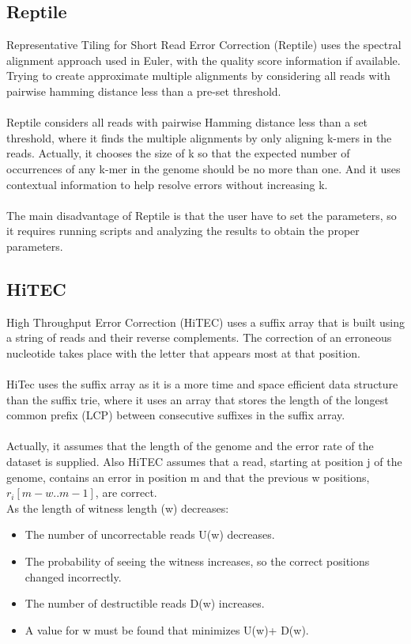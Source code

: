 \documentclass[12pt,openany]{llncs}
\begin{document}
\subsection{Reptile}
Representative Tiling for Short Read Error Correction (Reptile) \cite{Reptile} uses the spectral alignment approach used in Euler, with the quality score information if available. Trying to create approximate multiple alignments by considering all reads with pairwise hamming distance less than a pre-set threshold. 
\\
\\
Reptile considers all reads with pairwise Hamming distance less than a set threshold, where it finds the multiple alignments by only aligning k-mers in the reads. Actually, it chooses the size of k so that the expected number of occurrences of any k-mer in the genome should be no more than one. And it uses contextual information to help resolve errors without increasing k.
\\
\\
The main disadvantage of Reptile is that the user have to set the parameters, so it
requires running scripts and analyzing the results to obtain the proper parameters.

\subsection{HiTEC}
High Throughput Error Correction (HiTEC) \cite{HiTec} uses a suffix array that is built using a string of reads and their reverse complements. The correction of an erroneous nucleotide takes place with the letter that appears most at that position.
\\
\\
HiTec uses the suffix array as it is a more time and space efficient data structure than the suffix trie, where it uses an array that stores the length of the longest common prefix (LCP) between consecutive suffixes in the suffix array.
\\
\\
Actually, it assumes that the length of the genome and the error rate of the dataset is supplied. Also HiTEC assumes that a read, starting at position j of the genome, contains an error in position m and that the previous w positions, $r_{i} [m - w..m - 1]$, are correct.
\\
As the length of witness length (w) decreases:

\begin{itemize}
	\item The number of uncorrectable reads U(w) decreases.
	\item The probability of seeing the witness increases, so the correct positions changed incorrectly. 
	\item The number of destructible reads D(w) increases.
	\item A value for w must be found that minimizes U(w)+ D(w). 
\end{itemize}
\end{document}
